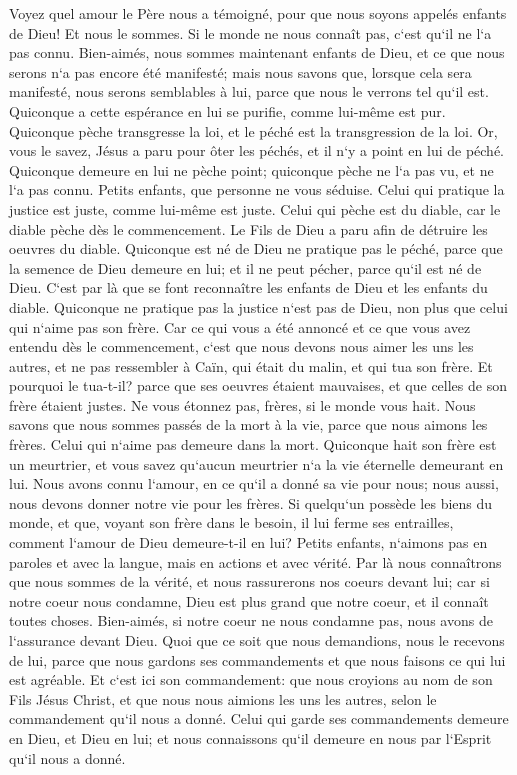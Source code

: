 \verse Voyez quel amour le Père nous a témoigné, pour que nous soyons appelés enfants de Dieu! Et nous le sommes. Si le monde ne nous connaît pas, c`est qu`il ne l`a pas connu. 
\verse Bien-aimés, nous sommes maintenant enfants de Dieu, et ce que nous serons n`a pas encore été manifesté; mais nous savons que, lorsque cela sera manifesté, nous serons semblables à lui, parce que nous le verrons tel qu`il est. 
\verse Quiconque a cette espérance en lui se purifie, comme lui-même est pur. 
\verse Quiconque pèche transgresse la loi, et le péché est la transgression de la loi. 
\verse Or, vous le savez, Jésus a paru pour ôter les péchés, et il n`y a point en lui de péché. 
\verse Quiconque demeure en lui ne pèche point; quiconque pèche ne l`a pas vu, et ne l`a pas connu. 
\verse Petits enfants, que personne ne vous séduise. Celui qui pratique la justice est juste, comme lui-même est juste. 
\verse Celui qui pèche est du diable, car le diable pèche dès le commencement. Le Fils de Dieu a paru afin de détruire les oeuvres du diable. 
\verse Quiconque est né de Dieu ne pratique pas le péché, parce que la semence de Dieu demeure en lui; et il ne peut pécher, parce qu`il est né de Dieu. 
\verse C`est par là que se font reconnaître les enfants de Dieu et les enfants du diable. Quiconque ne pratique pas la justice n`est pas de Dieu, non plus que celui qui n`aime pas son frère. 
\verse Car ce qui vous a été annoncé et ce que vous avez entendu dès le commencement, c`est que nous devons nous aimer les uns les autres, 
\verse et ne pas ressembler à Caïn, qui était du malin, et qui tua son frère. Et pourquoi le tua-t-il? parce que ses oeuvres étaient mauvaises, et que celles de son frère étaient justes. 
\verse Ne vous étonnez pas, frères, si le monde vous hait. 
\verse Nous savons que nous sommes passés de la mort à la vie, parce que nous aimons les frères. Celui qui n`aime pas demeure dans la mort. 
\verse Quiconque hait son frère est un meurtrier, et vous savez qu`aucun meurtrier n`a la vie éternelle demeurant en lui. 
\verse Nous avons connu l`amour, en ce qu`il a donné sa vie pour nous; nous aussi, nous devons donner notre vie pour les frères. 
\verse Si quelqu`un possède les biens du monde, et que, voyant son frère dans le besoin, il lui ferme ses entrailles, comment l`amour de Dieu demeure-t-il en lui? 
\verse Petits enfants, n`aimons pas en paroles et avec la langue, mais en actions et avec vérité. 
\verse Par là nous connaîtrons que nous sommes de la vérité, et nous rassurerons nos coeurs devant lui; 
\verse car si notre coeur nous condamne, Dieu est plus grand que notre coeur, et il connaît toutes choses. 
\verse Bien-aimés, si notre coeur ne nous condamne pas, nous avons de l`assurance devant Dieu. 
\verse Quoi que ce soit que nous demandions, nous le recevons de lui, parce que nous gardons ses commandements et que nous faisons ce qui lui est agréable. 
\verse Et c`est ici son commandement: que nous croyions au nom de son Fils Jésus Christ, et que nous nous aimions les uns les autres, selon le commandement qu`il nous a donné. 
\verse Celui qui garde ses commandements demeure en Dieu, et Dieu en lui; et nous connaissons qu`il demeure en nous par l`Esprit qu`il nous a donné. 

